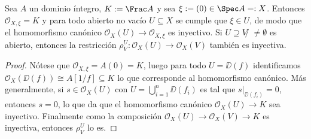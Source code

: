 \begin{lem}
	Sea $A$ un dominio íntegro, $K := \Frac A$ y sea $\xi := (0) \in \Spec A =: X$.
	Entonces $\mathscr{O}_{X,\xi} = K$ y para todo abierto no vacío $U \subseteq X$ se cumple que $\xi \in U$,
	de modo que el homomorfismo canónico $\mathscr{O}_X (U ) \to \mathscr{O}_{X,\xi}$ es inyectivo.
	Si $U \supseteq V ̸\ne \emptyset$ es abierto, entonces la restricción $\rho_V^U \colon \mathscr{O}_X(U ) \to \mathscr{O}_X(V)$ también es inyectiva.
\end{lem}
\begin{proof}
	Nótese que $\mathscr{O}_{X,\xi} = A(0) = K$, luego para todo $U = \DD(f)$ identificamos $\mathscr{O}_X(\DD(f)) \cong A[1/f] \subseteq K$
	lo que corresponde al homomorfismo canónico.
	Más generalmente, si $s \in \mathscr{O}_X(U)$ con $U = \bigcup_{i=1}^n \DD(f_i)$ es tal que $s|_{\DD(f_i)} = 0$, entonces $s = 0$,
	lo que da que el homomorfismo canónico $\mathscr{O}_X(U) \to K$ sea inyectivo.
	Finalmente como la composición $\mathscr{O}_X(U ) \to \mathscr{O}_X(V ) \to K$ es inyectiva, entonces $\rho_V^U$ lo es.
\end{proof}

